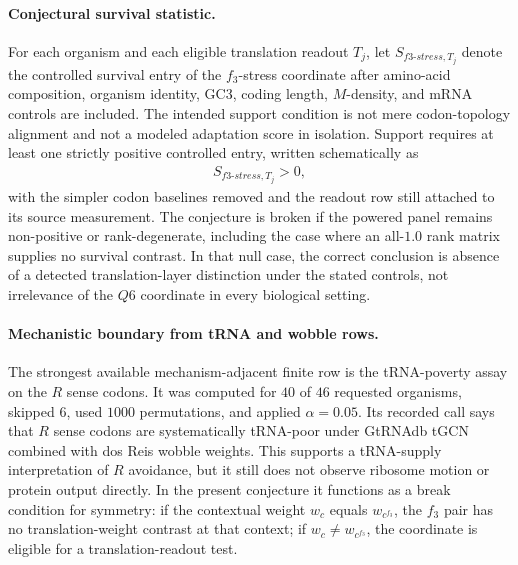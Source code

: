 \paragraph{Conjectural survival statistic.}
For each organism and each eligible translation readout $T_j$, let $S_{f3\text{-}stress,T_j}$ denote the controlled survival entry of the $f_3$-stress coordinate after amino-acid composition, organism identity, GC3, coding length, $M$-density, and mRNA controls are included. The intended support condition is not mere codon-topology alignment and not a modeled adaptation score in isolation. Support requires at least one strictly positive controlled entry, written schematically as
$$
\begin{aligned}
S_{f3\text{-}stress,T_j}>0,
\end{aligned}
$$
with the simpler codon baselines removed and the readout row still attached to its source measurement. The conjecture is broken if the powered panel remains non-positive or rank-degenerate, including the case where an all-$1.0$ rank matrix supplies no survival contrast. In that null case, the correct conclusion is absence of a detected translation-layer distinction under the stated controls, not irrelevance of the $Q6$ coordinate in every biological setting.

\paragraph{Mechanistic boundary from tRNA and wobble rows.}
The strongest available mechanism-adjacent finite row is the tRNA-poverty assay on the $R$ sense codons. It was computed for $40$ of $46$ requested organisms, skipped $6$, used $1000$ permutations, and applied $\alpha=0.05$. Its recorded call says that $R$ sense codons are systematically tRNA-poor under GtRNAdb tGCN combined with dos Reis wobble weights. This supports a tRNA-supply interpretation of $R$ avoidance, but it still does not observe ribosome motion or protein output directly. In the present conjecture it functions as a break condition for symmetry: if the contextual weight $w_c$ equals $w_{c^{f_3}}$, the $f_3$ pair has no translation-weight contrast at that context; if $w_c\ne w_{c^{f_3}}$, the coordinate is eligible for a translation-readout test.

